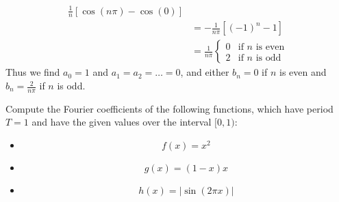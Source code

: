 \documentclass[11pt]{article}
\begin{document}
\begin{solution}
\begin{align*}
        \frac{1}{n} \left[ \cos(n\pi) - \cos(0) \right] 
        \\
        &= 
        -
        \frac{1}{n\pi}
        \left[ (-1)^n - 1 \right] 
        \\
        &= 
        \frac{1}{n\pi}
        \begin{cases}
            0 & \text{if } n \text{ is even} 
            \\
            2 & \text{if } n \text{ is odd}
        \end{cases}
    \end{align*}
    Thus we find $a_0 = 1$ and $a_1 = a_2 = \dots = 0$,
    and either $b_n = 0$ if $n$ is even and $b_n = \frac{2}{n\pi}$ if $n$ is odd. 
\end{solution}


\begin{exercise}
    Compute the Fourier coefficients of the following functions, which have period $T = 1$ and have the given values over the interval $[0,1)$:
    \begin{itemize}
     \item 
     \[
        f(x) = x^{2}
     \]
     \item 
     \[
        g(x) = (1-x)x
     \]
     \item 
     \[
        h(x) = |\sin( 2 \pi x )|
     \]
    \end{itemize}
\end{exercise}
\end{document}
